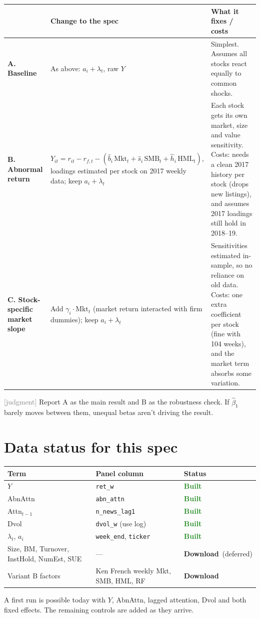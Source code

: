 \documentclass[11pt]{article}
\newcommand{\judg}{\textcolor{Gray}{\textsf{[judgment]}}}
\newcommand{\done}{\textcolor{ForestGreen}{\textbf{Built}}}
\newcommand{\dl}{\textcolor{BurntOrange}{\textbf{Download}}}
\newcommand{\var}[1]{\texttt{#1}}
\begin{document}
\begin{center}
\begin{tabularx}{\textwidth}{>{\raggedright}p{2.7cm} >{\raggedright}X >{\raggedright\arraybackslash}X}
\toprule
 & Change to the spec & What it fixes / costs\\
\midrule
\textbf{A. Baseline} & As above: $a_i + \lambda_t$, raw $Y$ & Simplest. Assumes all stocks react equally to common shocks.\\
\addlinespace
\textbf{B. Abnormal return} & $Y_{it} = r_{it} - r_{f,t} - (\hat b_i\,\text{Mkt}_t + \hat s_i\,\text{SMB}_t + \hat h_i\,\text{HML}_t)$, loadings estimated per stock on 2017 weekly data; keep $a_i + \lambda_t$ & Each stock gets its own market, size and value sensitivity. Costs: needs a clean 2017 history per stock (drops new listings), and assumes 2017 loadings still hold in 2018--19.\\
\addlinespace
\textbf{C. Stock-specific market slope} & Add $\gamma_i \cdot \text{Mkt}_t$ (market return interacted with firm dummies); keep $a_i + \lambda_t$ & Sensitivities estimated in-sample, so no reliance on old data. Costs: one extra coefficient per stock (fine with 104 weeks), and the market term absorbs some variation.\\
\bottomrule
\end{tabularx}
\end{center}
\judg{} Report A as the main result and B as the robustness check. If $\hat\beta_1$ barely moves between them, unequal betas aren't driving the result.

\section{Data status for this spec}

\begin{center}
\begin{tabularx}{0.85\textwidth}{>{\raggedright}X >{\raggedright}p{4.2cm} p{2.4cm}}
\toprule
Term & Panel column & Status\\
\midrule
$Y$ & \var{ret\_w} & \done\\
AbnAttn & \var{abn\_attn} & \done\\
Attn$_{t-1}$ & \var{n\_news\_lag1} & \done\\
Dvol & \var{dvol\_w} (use log) & \done\\
$\lambda_t$, $a_i$ & \var{week\_end}, \var{ticker} & \done\\
Size, BM, Turnover, InstHold, NumEst, SUE & --- & \dl\ (deferred)\\
Variant B factors & Ken French weekly Mkt, SMB, HML, RF & \dl\\
\bottomrule
\end{tabularx}
\end{center}
A first run is possible today with $Y$, AbnAttn, lagged attention, Dvol and both fixed effects. The remaining controls are added as they arrive.
\end{document}
